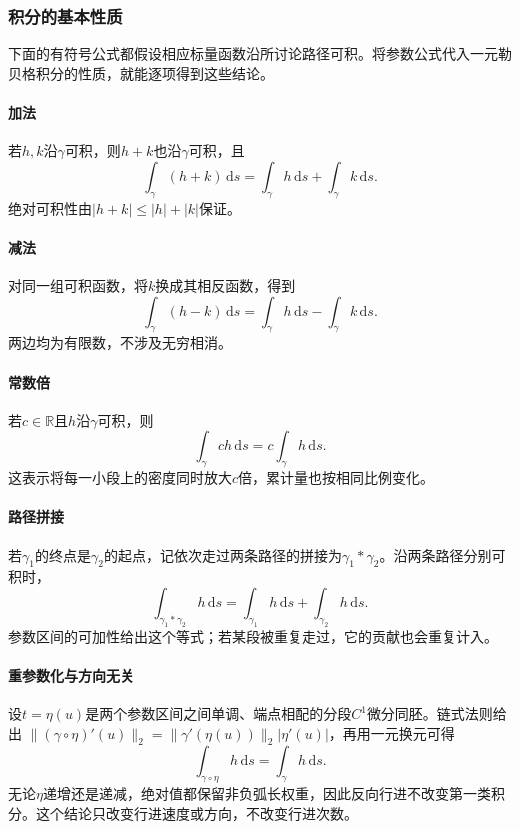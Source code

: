 \subsubsection{积分的基本性质}

下面的有符号公式都假设相应标量函数沿所讨论路径可积。将参数公式代入一元勒贝格积分的性质，就能逐项得到这些结论。

\paragraph{加法}

若$h,k$沿$\gamma$可积，则$h+k$也沿$\gamma$可积，且
\[
 \int_\gamma(h+k)\,\mathrm ds=\int_\gamma h\,\mathrm ds+\int_\gamma k\,\mathrm ds.
\]
绝对可积性由$|h+k|\leq|h|+|k|$保证。

\paragraph{减法}

对同一组可积函数，将$k$换成其相反函数，得到
\[
 \int_\gamma(h-k)\,\mathrm ds=\int_\gamma h\,\mathrm ds-\int_\gamma k\,\mathrm ds.
\]
两边均为有限数，不涉及无穷相消。

\paragraph{常数倍}

若$c\in\mathbb R$且$h$沿$\gamma$可积，则
\[
 \int_\gamma ch\,\mathrm ds=c\int_\gamma h\,\mathrm ds.
\]
这表示将每一小段上的密度同时放大$c$倍，累计量也按相同比例变化。

\paragraph{路径拼接}

若$\gamma_1$的终点是$\gamma_2$的起点，记依次走过两条路径的拼接为$\gamma_1*\gamma_2$。沿两条路径分别可积时，
\[
 \int_{\gamma_1*\gamma_2}h\,\mathrm ds
 =\int_{\gamma_1}h\,\mathrm ds+\int_{\gamma_2}h\,\mathrm ds.
\]
参数区间的可加性给出这个等式；若某段被重复走过，它的贡献也会重复计入。

\paragraph{重参数化与方向无关}

设$t=\eta(u)$是两个参数区间之间单调、端点相配的分段$C^1$微分同胚。链式法则给出
$\lVert(\gamma\circ\eta)'(u)\rVert_2=\lVert\gamma'(\eta(u))\rVert_2|\eta'(u)|$，再用一元换元可得
\[
 \int_{\gamma\circ\eta}h\,\mathrm ds=\int_\gamma h\,\mathrm ds.
\]
无论$\eta$递增还是递减，绝对值都保留非负弧长权重，因此反向行进不改变第一类积分。这个结论只改变行进速度或方向，不改变行进次数。

